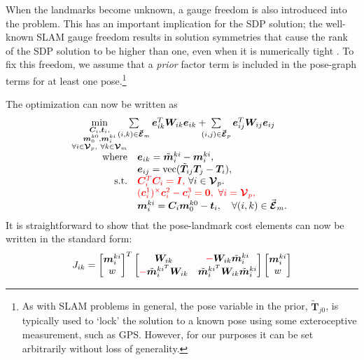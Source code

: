 \documentclass[lettersize,journal]{IEEEtran}
\newcommand{\EdgeSet}{\vec{\bm{\mathcal{E}}}}
\newcommand{\VertSetP}{\bm{\mathcal{V}}_p}
\newcommand{\VertSetM}{\bm{\mathcal{V}}_m}
\newcommand{\vect}[1]{\mbox{vec}(#1)}
\newcommand{\rev}[1]{\color{red}{#1}\color{black}}
\begin{document}
When the landmarks become unknown, a gauge freedom is also introduced into the problem. This has an important implication for the SDP solution; the well-known SLAM gauge freedom results in solution symmetries that cause the rank of the SDP solution to be higher than one, even when it is numerically tight \cite{brialesCertifiablyGloballyOptimal2018}. To fix this freedom, we assume that a \emph{prior} factor term is included in the pose-graph terms for at least one pose.\footnote{As with SLAM problems in general, the pose variable in the prior, $\tilde{\bm{T}}_{j0}$, is typically used to `lock' the solution to a known pose using some exteroceptive measurement, such as GPS. However, for our purposes it can be set arbitrarily without loss of generality.}

The optimization can now be written as
\begin{equation}
	\hspace*{-5pt}
	\label{opt:SLAM}
	\begin{array}{rl} 
		\min \limits_{ \substack{\bm{C}_i,\bm{t}_i, \\ \bm{m}_0^{k0},\bm{m}_i^{ki} \\ \forall i\in \VertSetP,~ \forall k\in\VertSetM } } & \hspace*{-20pt}\sum\limits_{(i,k)\in\EdgeSet_m} \bm{e}_{ik}^T \bm{W}_{ik} \bm{e}_{ik} + \hspace*{-7pt}\sum\limits_{(i,j)\in\EdgeSet_p}  \bm{e}_{ij}^T \bm{W}_{ij} \bm{e}_{ij}\hfill \\
		\mbox{where} & \bm{e}_{ik} = \tilde{\bm{m}}_i^{ki} - \bm{m}_i^{ki},\\
		&\bm{e}_{ij} = \vect{\tilde{\bm{T}}_{ij}\bm{T}_j - \bm{T}_i},\\
		\mbox{s.t.}&\rev{\bm{C}_i^T \bm{C}_i = \bm{I},}~\forall i \in \VertSetP.\\
		& \rev{(\bm{c}_i^{1})^\times\bm{c}_i^{2} - \bm{c}_i^{3} = \bm{0},~\forall i = \VertSetP,}\\
		& \bm{m}_i^{ki} = \bm{C}_i\bm{m}_0^{k0} - \bm{t}_i, \quad \forall (i,k)\in\EdgeSet_m.
	\end{array}
\end{equation}
It is straightforward to show that the pose-landmark cost elements can now be written in the standard form:
\begin{equation*}
	J_{ik}=\begin{bmatrix}
		\bm{m}_i^{ki}\\w
	\end{bmatrix}^T \begin{bmatrix}
		\bm{W}_{ik} & \rev{-}\bm{W}_{ik}\tilde{\bm{m}}_i^{ki}\\
		\rev{-}\tilde{\bm{m}}_i^{ki^T}\bm{W}_{ik} & \tilde{\bm{m}}_i^{ki^T}\bm{W}_{ik}\tilde{\bm{m}}_i^{ki}
	\end{bmatrix}\begin{bmatrix}
	\bm{m}_i^{ki}\\w
	\end{bmatrix}
\end{equation*}
\end{document}
